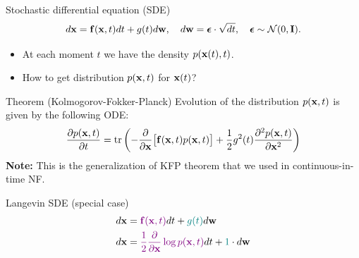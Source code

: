 \begin{frame}{Stochastic differential equation (SDE)}
	\vspace{-0.4cm}
	\[
		d\mathbf{x} = \mathbf{f}(\mathbf{x}, t) dt + g(t) d \mathbf{w}, \quad d \mathbf{w} = \boldsymbol{\epsilon} \cdot \sqrt{dt}, \quad \boldsymbol{\epsilon} \sim \mathcal{N}(0, \mathbf{I}).
	\]
	\vspace{-0.4cm}
	\begin{itemize}
		\item At each moment $t$ we have the density $p(\mathbf{x}(t), t)$.
		\item How to get distribution $p(\mathbf{x}, t)$ for $\mathbf{x}(t)$?
	\end{itemize}
 	\begin{block}{Theorem (Kolmogorov-Fokker-Planck)}
 		Evolution of the distribution $p(\mathbf{x}, t)$ is given by the following ODE:
 		\vspace{-0.2cm}
 		\[
 			\frac{\partial p(\mathbf{x}, t)}{\partial t} = \text{tr}\left(- \frac{\partial}{\partial \mathbf{x}} \bigl[ \mathbf{f}(\mathbf{x}, t) p(\mathbf{x}, t)\bigr] + \frac{1}{2} g^2(t) \frac{\partial^2 p(\mathbf{x}, t)}{\partial \mathbf{x}^2} \right)
 		\]
 		\textbf{Note:} This is the generalization of KFP theorem that we used in continuous-in-time NF.
 	\end{block}
 	\begin{block}{Langevin SDE (special case)}
 		\vspace{-0.6cm}
 		\begin{align*}
 			d\mathbf{x} &= {\color{violet}\mathbf{f}(\mathbf{x}, t)} dt + {\color{teal}g(t)} d \mathbf{w} \\
 			d \mathbf{x} &= {\color{violet}\frac{1}{2} \frac{\partial}{\partial \mathbf{x}} \log p(\mathbf{x}, t)} d t + {\color{teal} 1 } \cdot d \mathbf{w}
 		\end{align*}
 	\end{block}
\end{frame}
